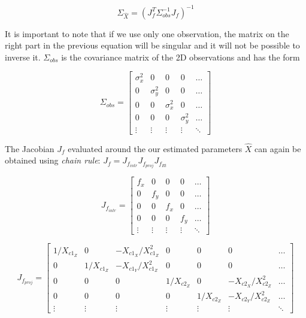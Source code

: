 \begin{equation}
    \Sigma_{\hat{X}} = (J_f^T \Sigma_{obs}^{-1} J_f)^{-1}
\end{equation}

It is important to note that if we use only one observation, the matrix on the right part in the previous equation will be singular and it will not be possible to inverse it.
$\Sigma_{obs}$ is the covariance matrix of the 2D observations and has the form

\begin{equation}
    \Sigma_{obs} = \left[\begin{array}{ccccc}
        \sigma_x^2 & 0 & 0 & 0 & \hdots \\
        0 & \sigma_y^2 & 0 & 0 & \hdots \\
        0 & 0 & \sigma_x^2 & 0 & \hdots \\
        0 & 0 & 0 & \sigma_y^2 & \hdots \\
        \vdots & \vdots & \vdots & \vdots & \ddots 
    \end{array}\right]
\end{equation}



The Jacobian $J_f$ evaluated around the our estimated parameters $\hat{X}$ can again be obtained using \textit{chain rule}: $J_f = J_{f_{intr}} J_{f_{proj}} J_{f_{Rt}}$

\begin{equation}
   J_{f_{intr}} = \left[\begin{array}{ccccc}
       f_x & 0 & 0 & 0 & \hdots\\
        0 & f_y & 0 & 0 &\hdots \\
        0 & 0 & f_x & 0 & \hdots\\
        0 & 0 & 0 & f_y &\hdots \\
        \vdots & \vdots &  \vdots &  \vdots &  \ddots
   \end{array}\right]
\end{equation}

\begin{equation}
   J_{f_{proj}} = \left[\begin{array}{ccccccc}
       1/X_{c1_Z} & 0 & - X_{c1_X}/X^2_{c1_Z} &0&0&0&\hdots \\
       0 & 1/X_{c1_Z} & - X_{c1_Y}/X^2_{c1_Z} &0&0&0&\hdots \\
       0&0&0& 1/X_{c2_Z} & 0 & - X_{c2_X}/X^2_{c2_Z} &\hdots \\
       0&0&0& 0 & 1/X_{c2_Z} & - X_{c2_Y}/X^2_{c2_Z} &\hdots \\
       \vdots & \vdots & \vdots & \vdots & \vdots & \vdots & \ddots
   \end{array}\right]
\end{equation}

